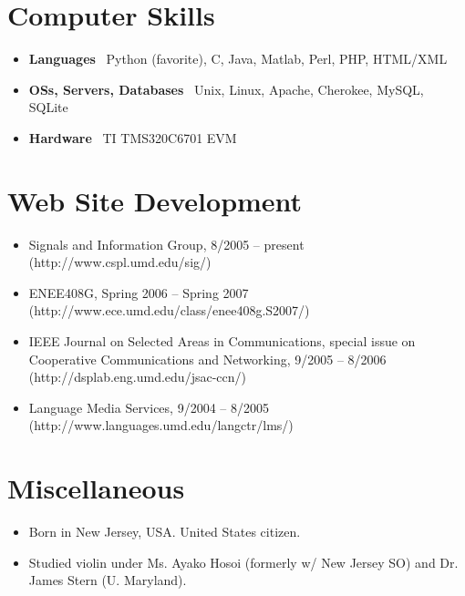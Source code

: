 \documentclass[10pt,letterpaper]{article}
\begin{document}
\section*{Computer Skills}

\begin{itemize}
\item \textbf{Languages} \ Python (favorite), C, Java, Matlab, Perl, PHP, HTML/XML
\item \textbf{OSs, Servers, Databases} \ Unix, Linux, Apache, Cherokee, MySQL, SQLite
\item \textbf{Hardware} \ TI TMS320C6701 EVM
\end{itemize}


\section*{Web Site Development}

\begin{itemize}
\item Signals and Information Group, 8/2005 -- present (http://www.cspl.umd.edu/sig/)
\item ENEE408G, Spring 2006 -- Spring 2007 (http://www.ece.umd.edu/class/enee408g.S2007/)
\item IEEE Journal on Selected Areas in Communications, special issue on Cooperative Communications and Networking, 9/2005 -- 8/2006 (http://dsplab.eng.umd.edu/jsac-ccn/)
\item Language Media Services, 9/2004 -- 8/2005 (http://www.languages.umd.edu/langctr/lms/)
\end{itemize}


\section*{Miscellaneous}

\begin{itemize}
\item Born in New Jersey, USA. United States citizen.
\item Studied violin under Ms. Ayako Hosoi (formerly w/ New Jersey SO) and Dr. James Stern (U. Maryland).
\end{itemize}
\end{document}
